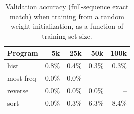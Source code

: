 \begin{table}[t]
\centering
\caption{Validation accuracy (full-sequence exact match) when training from a random weight initialization, as a function of training-set size.}
\label{tab:random-init-baseline}
\begin{tabular}{lrrrr}
\toprule
Program & 5k & 25k & 50k & 100k \\
\midrule
hist & 0.8\% & 0.4\% & 0.3\% & 0.3\% \\
most-freq & 0.0\% & 0.0\% & -- & -- \\
reverse & 0.0\% & 0.0\% & 0.0\% & -- \\
sort & 0.0\% & 0.3\% & 6.3\% & 8.4\% \\
\bottomrule
\end{tabular}
\end{table}
